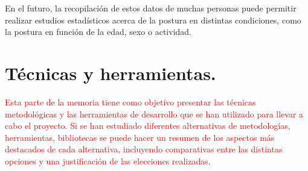 En el futuro, la recopilación de estos datos de muchas personas puede permitir realizar estudios estadísticos acerca de la postura en distintas condiciones, como la postura en función de la edad, sexo o actividad.

 
\section{Técnicas y herramientas.}

\textcolor{red}{Esta parte de la memoria tiene como objetivo presentar las técnicas metodológicas y las herramientas de desarrollo que se han utilizado para llevar a cabo el proyecto. Si se han estudiado diferentes alternativas de metodologías, herramientas, bibliotecas se puede hacer un resumen de los aspectos más destacados de cada alternativa, incluyendo comparativas entre las distintas opciones y una justificación de las elecciones realizadas. }

